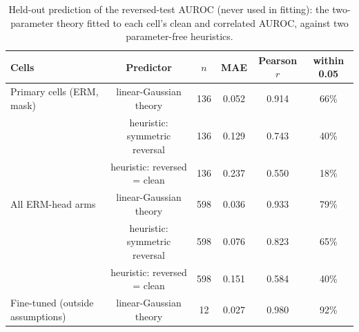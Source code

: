 \begin{table}[H]\centering\scriptsize
\caption{Held-out prediction of the reversed-test AUROC (never used in fitting): the two-parameter theory fitted to each cell's clean and correlated AUROC, against two parameter-free heuristics.}\label{tab:theory}
\begin{tabular}{lccccc}\toprule
Cells & Predictor & $n$ & MAE & Pearson $r$ & within 0.05 \\\midrule
Primary cells (ERM, mask) & linear-Gaussian theory & 136 & 0.052 & 0.914 & 66\% \\
 & heuristic: symmetric reversal & 136 & 0.129 & 0.743 & 40\% \\
 & heuristic: reversed = clean & 136 & 0.237 & 0.550 & 18\% \\
All ERM-head arms & linear-Gaussian theory & 598 & 0.036 & 0.933 & 79\% \\
 & heuristic: symmetric reversal & 598 & 0.076 & 0.823 & 65\% \\
 & heuristic: reversed = clean & 598 & 0.151 & 0.584 & 40\% \\
Fine-tuned (outside assumptions) & linear-Gaussian theory & 12 & 0.027 & 0.980 & 92\% \\
\bottomrule\end{tabular}
\end{table}
